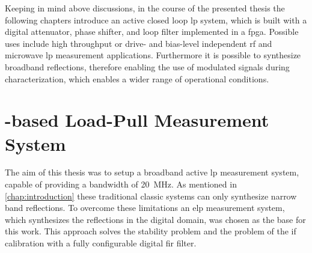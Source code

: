 \documentclass[12pt,a4paper,parskip=full,abstract=true,BCOR=10mm,twoside,open=right]{scrreprt}
\begin{document}
Keeping in mind above discussions, in the course of the presented thesis the following chapters introduce an active closed loop \gls{lp} system, which
is built with a digital attenuator, phase shifter, and loop filter implemented
in a \gls{fpga}. Possible uses include high throughput or drive- and bias-level
independent \gls{rf} and microwave \gls{lp} measurement applications. Furthermore
it is possible to synthesize broadband reflections, therefore enabling the use
of modulated signals during characterization, which enables a wider range of
operational conditions.


\chapter{-based Load-Pull Measurement System}
\label{chap:measurement_system}

The aim of this thesis was to setup a broadband active \gls{lp} measurement system, capable of providing a bandwidth of \SI{20}{\mega\hertz}.
As mentioned in \cref{chap:introduction} these traditional classic systems can only synthesize
narrow band reflections. To overcome these limitations an \gls{elp} measurement system, which
synthesizes the reflections in the digital domain, was chosen as the base for this work. This approach solves the stability problem
and the problem of the \gls{if} calibration with a fully configurable digital \gls{fir} filter.
\end{document}
